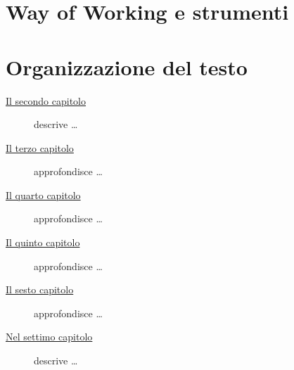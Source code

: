 \section{Way of Working e strumenti}

\section{Organizzazione del testo}

\begin{description}
    \item[{\hyperref[cap:tecnologie]{Il secondo capitolo}}] descrive \ldots
    
    \item[{\hyperref[cap:descrizione-stage]{Il terzo capitolo}}] approfondisce \ldots
    
    \item[{\hyperref[cap:analisi-requisiti]{Il quarto capitolo}}] approfondisce \ldots
    
    \item[{\hyperref[cap:progettazione-codifica]{Il quinto capitolo}}] approfondisce \ldots
    
    \item[{\hyperref[cap:verifica-validazione]{Il sesto capitolo}}] approfondisce \ldots
    
    \item[{\hyperref[cap:conclusioni]{Nel settimo capitolo}}] descrive \ldots
\end{description}

